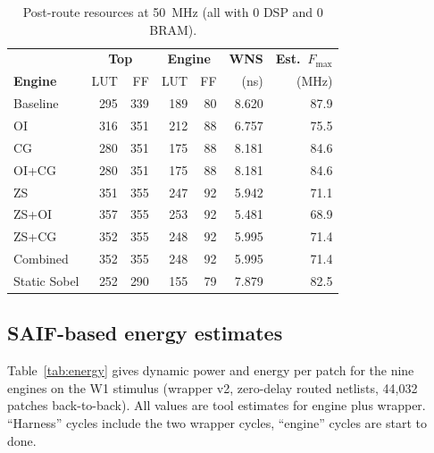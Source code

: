 \documentclass[11pt,journal,draftclsnofoot,onecolumn]{IEEEtran}
\begin{document}
\begin{table}[t]
\centering
\caption{Post-route resources at 50~MHz (all with 0 DSP and 0 BRAM).}
\label{tab:res}
\small
\setlength{\tabcolsep}{6pt}
\begin{tabular}{lrrrrrr}
\toprule
 & \multicolumn{2}{c}{\textbf{Top}} & \multicolumn{2}{c}{\textbf{Engine}} & \textbf{WNS} & \textbf{Est.\ $F_{\max}$}\\
\textbf{Engine} & LUT & FF & LUT & FF & (ns) & (MHz)\\
\midrule
Baseline     & 295 & 339 & 189 & 80 & 8.620 & 87.9\\
OI           & 316 & 351 & 212 & 88 & 6.757 & 75.5\\
CG           & 280 & 351 & 175 & 88 & 8.181 & 84.6\\
OI+CG        & 280 & 351 & 175 & 88 & 8.181 & 84.6\\
ZS           & 351 & 355 & 247 & 92 & 5.942 & 71.1\\
ZS+OI        & 357 & 355 & 253 & 92 & 5.481 & 68.9\\
ZS+CG        & 352 & 355 & 248 & 92 & 5.995 & 71.4\\
Combined     & 352 & 355 & 248 & 92 & 5.995 & 71.4\\
Static Sobel & 252 & 290 & 155 & 79 & 7.879 & 82.5\\
\bottomrule
\end{tabular}
\end{table}

\subsection{SAIF-based energy estimates}\label{sec:r-energy}
Table~\ref{tab:energy} gives dynamic power and energy per patch for the nine engines on
the W1 stimulus (wrapper v2, zero-delay routed netlists, 44{,}032 patches back-to-back).
All values are tool estimates for engine plus wrapper. ``Harness'' cycles include the two
wrapper cycles, ``engine'' cycles are start to done.
\end{document}
